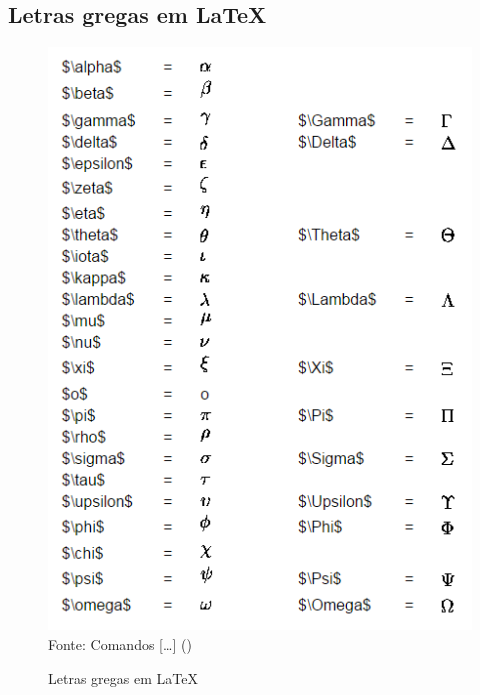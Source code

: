 \begin{anexosenv}
\chapter{Letras gregas em \LaTeX}
\begin{figure}[H]
	\begin{center}
		\caption{\label{fig_anexod}Letras gregas em \LaTeX}
		\includegraphics[scale=1.0]{USPSC-img/USPSC-LetrasGregas.png} \\
		Fonte: Comandos [\ldots]  (\citeyear{comandos})
	\end{center}	
\end{figure}

\end{anexosenv}
